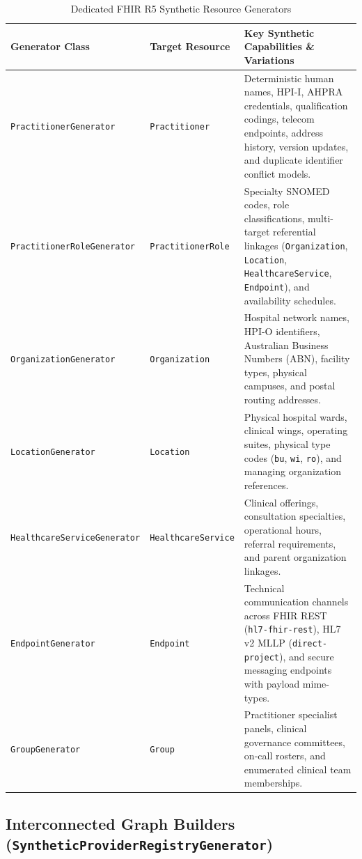 \begin{table}[htbp]
\centering
\small
\begin{tabularx}{\textwidth}{l l X}
\toprule
\textbf{Generator Class} & \textbf{Target Resource} & \textbf{Key Synthetic Capabilities \& Variations} \\
\midrule
\texttt{PractitionerGenerator} & \texttt{Practitioner} & Deterministic human names, HPI-I, AHPRA credentials, qualification codings, telecom endpoints, address history, version updates, and duplicate identifier conflict models. \\
\addlinespace
\texttt{PractitionerRoleGenerator} & \texttt{PractitionerRole} & Specialty SNOMED codes, role classifications, multi-target referential linkages (\texttt{Organization}, \texttt{Location}, \texttt{HealthcareService}, \texttt{Endpoint}), and availability schedules. \\
\addlinespace
\texttt{OrganizationGenerator} & \texttt{Organization} & Hospital network names, HPI-O identifiers, Australian Business Numbers (ABN), facility types, physical campuses, and postal routing addresses. \\
\addlinespace
\texttt{LocationGenerator} & \texttt{Location} & Physical hospital wards, clinical wings, operating suites, physical type codes (\texttt{bu}, \texttt{wi}, \texttt{ro}), and managing organization references. \\
\addlinespace
\texttt{HealthcareServiceGenerator} & \texttt{HealthcareService} & Clinical offerings, consultation specialties, operational hours, referral requirements, and parent organization linkages. \\
\addlinespace
\texttt{EndpointGenerator} & \texttt{Endpoint} & Technical communication channels across FHIR REST (\texttt{hl7-fhir-rest}), HL7 v2 MLLP (\texttt{direct-project}), and secure messaging endpoints with payload mime-types. \\
\addlinespace
\texttt{GroupGenerator} & \texttt{Group} & Practitioner specialist panels, clinical governance committees, on-call rosters, and enumerated clinical team memberships. \\
\bottomrule
\end{tabularx}
\caption{Dedicated FHIR R5 Synthetic Resource Generators}
\label{tab:paradeigma_fhir_generators}
\end{table}

\subsection{Interconnected Graph Builders (\texttt{SyntheticProviderRegistryGenerator})}

